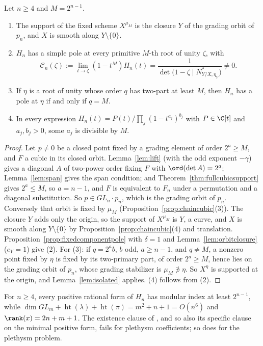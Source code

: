 \begin{theorem}\label{thm:plethysmPH3}
Let $n\ge4$ and $M=2^{n-1}$.
\begin{enumerate}
\item The support of the fixed scheme $X^{\mu_M}$ is the closure $Y$ of the
grading orbit of $p_n$, and $X$ is smooth along $Y\setminus\{0\}$.
\item $H_n$ has a simple pole at every primitive $M$-th root of unity $\zeta$,
with
\begin{equation}\label{eq:plethysmresidue}
 \mathcal C_n(\zeta):=\lim_{t\to\zeta}(1-t^M)H_n(t)
 =\frac1{\det\bigl(1-\zeta\mid N^*_{Y/X,\eta_Y}\bigr)}\ne0 .
\end{equation}
\item If $\eta$ is a root of unity whose order $q$ has two-part at least $M$,
then $H_n$ has a pole at $\eta$ if and only if $q=M$.
\item In every expression $H_n(t)=P(t)/\prod_j(1-t^{a_j})^{b_j}$ with
$P\in\C[t]$ and $a_j,b_j>0$, some $a_j$ is divisible by $M$.
\end{enumerate}
\end{theorem}

\begin{proof}
Let $p\ne0$ be a closed point fixed by a grading element of order $2^a\ge M$,
and $F$ a cubic in its closed orbit. Lemma~\ref{lem:lift} (with the odd
exponent $-\gamma$) gives a diagonal $A$ of two-power order fixing $F$ with
$\ord(\det A)=2^a$; Lemma~\ref{lem:span} gives the span condition; and
Theorem~\ref{thm:fullcubicsupport} gives $2^a\le M$, so $a=n-1$, and $F$ is
equivalent to $F_n$ under a permutation and a diagonal substitution. So
$p\in GL_n\cdot p_n$, which is the grading orbit of $p_n$. Conversely that
orbit is fixed by $\mu_M$ (Proposition~\ref{prop:chaincubic}(3)). The closure
$Y$ adds only the origin, so the support of $X^{\mu_M}$ is $Y$, a curve, and
$X$ is smooth along $Y\setminus\{0\}$ by Proposition~\ref{prop:chaincubic}(4)
and translation. Proposition~\ref{prop:fixedcomponentpole} with $\delta=1$ and
Lemma~\ref{lem:orbitclosure} ($e_Y=1$) give (2). For (3): if $q=2^ab$, $b$ odd,
$a\ge n-1$, and $q\ne M$, a nonzero point fixed by $\eta$ is fixed by its
two-primary part, of order $2^a\ge M$, hence lies on the grading orbit of
$p_n$, whose grading stabilizer is $\mu_M\not\ni\eta$. So $X^\eta$ is supported
at the origin, and Lemma~\ref{lem:isolated} applies. (4) follows from (2).
\end{proof}

\begin{corollary}\label{cor:plethysmPH3}
For $n\ge4$, every positive rational form of $H_n$ has modular index at least
$2^{n-1}$, while $\dim GL_m+\operatorname{ht}(\lambda)+\operatorname{ht}(\pi)
=m^2+n+1=O(n^6)$ and $\rank(x)=2n+m+1$. The existence clause of
\cite[Hypothesis 1.6.7]{GCT6}, and so also its specific clause on the minimal
positive form, fails for plethysm coefficients; so does
\cite[Hypothesis 3.3.4]{GCT6} for the plethysm problem.
\end{corollary}

